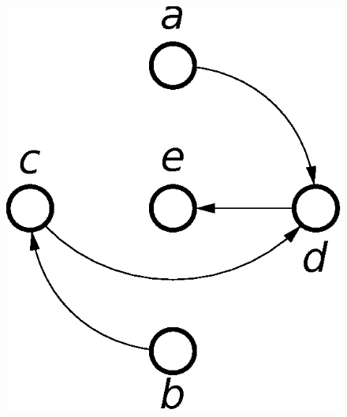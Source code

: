 \begin{figure}[h]
\begin{centering}
{\includegraphics[scale=0.45]{fig/dag_sub}}\hfill{}\hfill{}\hfill{}\hfill{}
\par\end{centering}


\end{figure}
